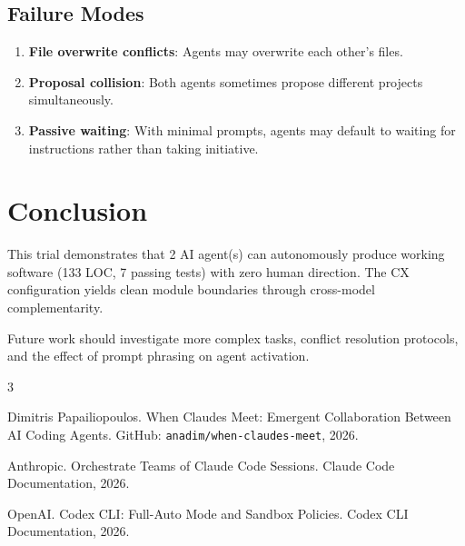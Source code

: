 \documentclass[11pt,a4paper]{article}
\begin{document}
\subsection{Failure Modes}

\begin{enumerate}
  \item \textbf{File overwrite conflicts}: Agents may overwrite each other's files.
  \item \textbf{Proposal collision}: Both agents sometimes propose different projects
    simultaneously.
  \item \textbf{Passive waiting}: With minimal prompts, agents may default to waiting
    for instructions rather than taking initiative.
\end{enumerate}

\section{Conclusion}

This trial demonstrates that 2 AI agent(s) can autonomously
produce working software (133 LOC, 7 passing tests) with zero human direction. The CX configuration yields clean module boundaries through cross-model complementarity.

Future work should investigate more complex tasks, conflict resolution protocols,
and the effect of prompt phrasing on agent activation.


\begin{thebibliography}{3}

Dimitris Papailiopoulos.
\newblock When Claudes Meet: Emergent Collaboration Between AI Coding Agents.
\newblock GitHub: \texttt{anadim/when-claudes-meet}, 2026.

Anthropic.
\newblock Orchestrate Teams of Claude Code Sessions.
\newblock Claude Code Documentation, 2026.

OpenAI.
\newblock Codex CLI: Full-Auto Mode and Sandbox Policies.
\newblock Codex CLI Documentation, 2026.

\end{thebibliography}

\appendix
\end{document}
